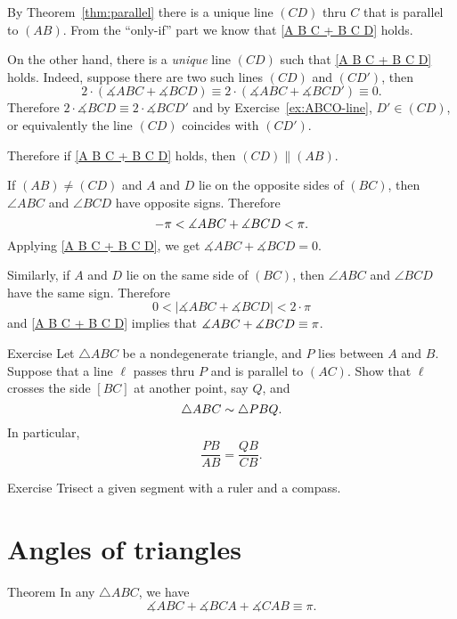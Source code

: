 By Theorem~\ref{thm:parallel} there is a unique line $(CD)$ thru $C$ that is parallel to $(AB)$.
From the ``only-if'' part we know that  \ref{A B C + B C D} holds.

On the other hand, there is a \emph{unique} line $(CD)$ such that \ref{A B C + B C D} holds.
Indeed, suppose there are two such lines $(CD)$ and $(CD')$, then
$$2\cdot(\measuredangle A B C+\measuredangle B C D)\equiv 2\cdot(\measuredangle A B C+\measuredangle B C D')\equiv0.
$$ 
Therefore 
$2\cdot\measuredangle B C D\equiv 2\cdot\measuredangle B C D'$
and by Exercise~\ref{ex:ABCO-line},  $D'\in (CD)$, or equivalently the line $(CD)$ coincides with $(CD')$.

Therefore if \ref{A B C + B C D} holds, then $(CD)\parallel (AB)$.


If $(AB)\ne(C D)$ and $A$ and $D$ lie on the opposite sides of $(BC)$, then $\angle ABC$ and $\angle BCD$ have opposite signs.
Therefore
\[-\pi\z<\measuredangle A B C+\measuredangle B C D<\pi.\]
Applying \ref{A B C + B C D}, we get $\measuredangle A B C+\measuredangle B C D=0$.

Similarly, if $A$ and $D$ lie on the same side of $(BC)$,
then $\angle ABC$ and $\angle BCD$ have the same sign.
Therefore
\[0<|\measuredangle A B C+\measuredangle B C D|<2\cdot\pi\]
and \ref{A B C + B C D} implies that $\measuredangle A B C+\measuredangle B C D\z\equiv\pi$.
\qeds

\begin{thm}{Exercise}\label{ex:smililar+parallel}
Let $\triangle ABC$ be a nondegenerate triangle, and $P$ lies between $A$ and $B$.
Suppose that a line $\ell$ passes thru $P$ and is parallel to $(AC)$.
Show that $\ell$ crosses the side $[BC]$ at another point, say $Q$, and 
\[\triangle ABC\z\sim\triangle PBQ.\]
In particular, 
\[\frac{PB}{AB}=\frac{QB}{CB}.\]

\end{thm} 

\begin{thm}{Exercise}\label{ex:trisection}
Trisect a given segment with a ruler and a compass.
\end{thm}

\section*{Angles of triangles}

\begin{thm}{Theorem}\label{thm:3sum}
In any $\triangle A B C$, we have
$$\measuredangle A B C+ \measuredangle B C A + \measuredangle C A B \equiv \pi.$$

\end{thm}

